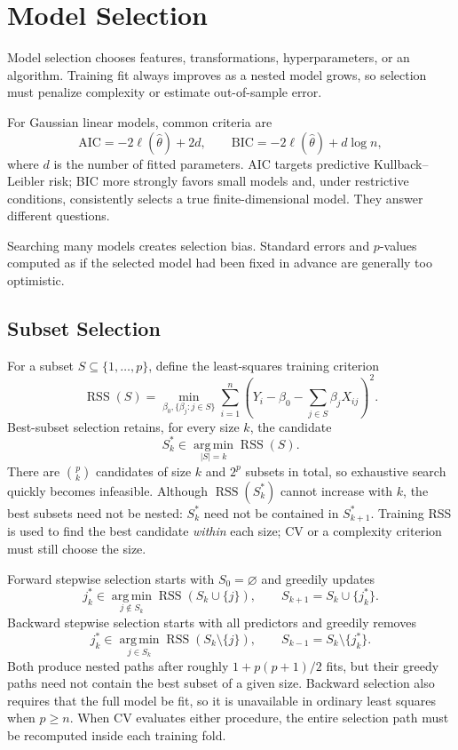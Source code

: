 \documentclass[12pt,oneside]{book}
\numberwithin{equation}{section}
\theoremstyle{definition}
\theoremstyle{plain}
\theoremstyle{remark}
\newcommand{\argmin}{\operatorname*{arg\,min}}
\begin{document}
\section{Model Selection}

Model selection chooses features, transformations, hyperparameters, or an
algorithm. Training fit always improves as a nested model grows, so selection
must penalize complexity or estimate out-of-sample error.

For Gaussian linear models, common criteria are
\[
 \mathrm{AIC}=-2\ell(\widehat\theta)+2d,\qquad
 \mathrm{BIC}=-2\ell(\widehat\theta)+d\log n,
\]
where $d$ is the number of fitted parameters. AIC targets predictive
Kullback--Leibler risk; BIC more strongly favors small models and, under
restrictive conditions, consistently selects a true finite-dimensional model.
They answer different questions.

Searching many models creates selection bias. Standard errors and $p$-values
computed as if the selected model had been fixed in advance are generally too
optimistic.

\subsection{Subset Selection}

For a subset $S\subseteq\{1,\ldots,p\}$, define the least-squares training
criterion
\[
 \operatorname{RSS}(S)
 =\min_{\beta_0,\{\beta_j:j\in S\}}
   \sum_{i=1}^n\left(Y_i-\beta_0-\sum_{j\in S}\beta_jX_{ij}\right)^2.
\]
Best-subset selection retains, for every size $k$, the candidate
\[
 S_k^*\in\argmin_{|S|=k}\operatorname{RSS}(S).
\]
There are $\binom pk$ candidates of size $k$ and $2^p$ subsets in total, so
exhaustive search quickly becomes infeasible. Although
$\operatorname{RSS}(S_k^*)$ cannot increase with $k$, the best subsets need
not be nested: $S_k^*$ need not be contained in $S_{k+1}^*$. Training RSS is
used to find the best candidate \emph{within} each size; CV or a complexity
criterion must still choose the size.

Forward stepwise selection starts with $S_0=\varnothing$ and greedily updates
\[
 j_k^*\in\argmin_{j\notin S_k}\operatorname{RSS}(S_k\cup\{j\}),
 \qquad S_{k+1}=S_k\cup\{j_k^*\}.
\]
Backward stepwise selection starts with all predictors and greedily removes
\[
 j_k^*\in\argmin_{j\in S_k}\operatorname{RSS}(S_k\setminus\{j\}),
 \qquad S_{k-1}=S_k\setminus\{j_k^*\}.
\]
Both produce nested paths after roughly $1+p(p+1)/2$ fits, but their greedy
paths need not contain the best subset of a given size. Backward selection
also requires that the full model be fit, so it is unavailable in ordinary
least squares when $p\geq n$. When CV evaluates either procedure, the entire
selection path must be recomputed inside each training fold.
\end{document}
